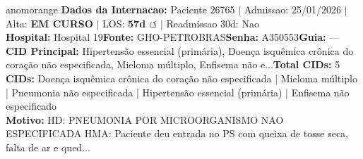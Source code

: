 \documentclass[a4paper,10pt]{article}
\begin{document}
\begin{anomalycard}[Internacao 163212 | GHO-PETROBRAS | ALTO (z=3.75)]{anomorange}
\textbf{Dados da Internacao:} Paciente 26765 $\mid$ Admissao: 25/01/2026 $\mid$ Alta: \textcolor{anomorange}{\textbf{EM CURSO}} $\mid$ LOS: \textbf{57d \textcolor{anomorange}{$\circlearrowleft$}} $\mid$ Readmissao 30d: Nao\\
\textbf{Hospital:} Hospital 19\quad\textbf{Fonte:} GHO-PETROBRAS\quad\textbf{Senha:} A350553\quad\textbf{Guia:} ---\\
\textbf{CID Principal:} {\small Hipertensão essencial (primária), Doença isquêmica crônica do coração não especificada, Mieloma múltiplo, Enfisema não e...}\quad\textbf{Total CIDs:} 5\\

\textbf{CIDs:} {\scriptsize Doença isquêmica crônica do coração não especificada | Mieloma múltiplo | Pneumonia não especificada | Hipertensão essencial (primária) | Enfisema não especificado}\\

\textbf{Motivo:} {\scriptsize HD: PNEUMONIA POR MICROORGANISMO NAO ESPECIFICADA  HMA:  Paciente deu entrada no PS com queixa de tosse seca, falta de ar e qued...}\\


\end{anomalycard}
\end{document}
